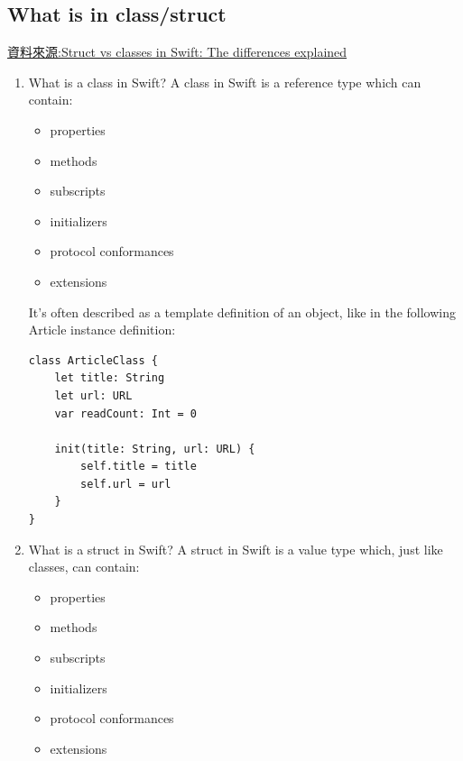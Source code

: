 \documentclass[a4paper,12pt]{article}
\begin{document}
\subsection{What is in class/struct}
\label{sec:org4dbee0d}
\href{https://www.avanderlee.com/swift/struct-class-differences/}{資料來源:Struct vs classes in Swift: The differences explained}\\
\begin{enumerate}
\item What is a class in Swift?
\label{sec:orgb5c2613}
A class in Swift is a reference type which can contain:\\
\begin{itemize}
\item properties\\
\item methods\\
\item subscripts\\
\item initializers\\
\item protocol conformances\\
\item extensions\\
\end{itemize}

It’s often described as a template definition of an object, like in the following Article instance definition:\\
\lstset{breaklines=true,language=swift,label= ,caption= ,captionpos=b,firstnumber=1,numbers=left}
\begin{lstlisting}
class ArticleClass {
    let title: String
    let url: URL
    var readCount: Int = 0

    init(title: String, url: URL) {
        self.title = title
        self.url = url
    }
}
\end{lstlisting}
\item What is a struct in Swift?
\label{sec:orge99f27d}
A struct in Swift is a value type which, just like classes, can contain:\\
\begin{itemize}
\item properties\\
\item methods\\
\item subscripts\\
\item initializers\\
\item protocol conformances\\
\item extensions\\
\end{itemize}


\end{enumerate}
\end{document}
